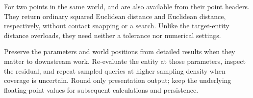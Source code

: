 For two points in the same world,  and
 are also available from their point headers.
They return ordinary squared Euclidean distance and Euclidean distance,
respectively, without contact snapping or a search. Unlike the target-entity
distance overloads, they need neither a tolerance nor numerical settings.

\begin{manualnote}
Preserve the parameters and world positions from detailed results when they
matter to downstream work. Re-evaluate the entity at those parameters, inspect
the residual, and repeat sampled queries at higher sampling density when
coverage is uncertain. Round only presentation output; keep the underlying
floating-point values for subsequent calculations and persistence.
\end{manualnote}
